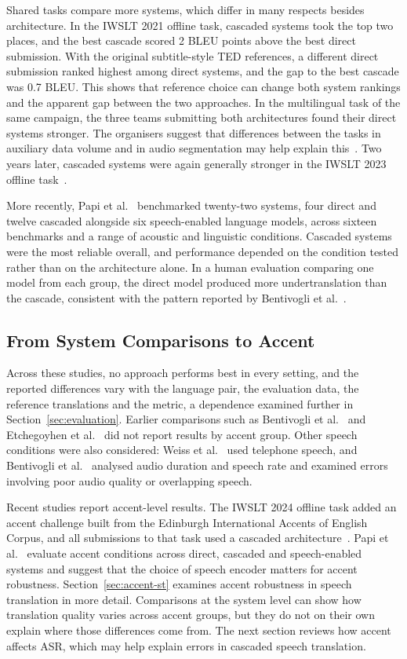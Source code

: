 Shared tasks compare more systems, which differ in many respects besides
architecture. In the IWSLT 2021 offline task, cascaded systems took the top two
places, and the best cascade scored 2 BLEU points above the best direct
submission. With the original subtitle-style TED references, a different direct
submission ranked highest among direct systems, and the gap to the best cascade
was 0.7 BLEU. This shows that reference choice can change both system rankings
and the apparent gap between the two approaches. In the multilingual task of
the same campaign, the three teams submitting both architectures found their
direct systems stronger.
The organisers suggest that differences between the tasks in auxiliary data
volume and in audio segmentation may help explain
this~\cite{anastasopoulos2021iwslt}. Two years later, cascaded systems were
again generally stronger in the IWSLT 2023 offline
task~\cite{agarwal2023iwslt}.

More recently, Papi et al.~\cite{papi2026hearing} benchmarked twenty-two
systems, four direct and twelve cascaded alongside six speech-enabled language
models, across sixteen benchmarks and a range of acoustic and linguistic
conditions. Cascaded systems were the most reliable overall, and performance
depended on the condition tested rather than on the architecture alone. In a
human evaluation comparing one model from each group, the direct model produced
more undertranslation than the cascade, consistent with the pattern reported by
Bentivogli et al.~\cite{bentivogli2021cascade}.

\subsection{From System Comparisons to Accent}

Across these studies, no approach performs best in every setting, and the
reported differences vary with the language pair, the evaluation data, the
reference translations and the metric, a dependence examined further in
Section~\ref{sec:evaluation}. Earlier comparisons such as Bentivogli et
al.~\cite{bentivogli2021cascade} and Etchegoyhen et
al.~\cite{etchegoyhen2022casestudy} did not report results by accent group.
Other speech conditions were also considered: Weiss et
al.~\cite{weiss2017sequence} used telephone speech, and Bentivogli et
al.~\cite{bentivogli2021cascade} analysed audio duration and speech rate and
examined errors involving poor audio quality or overlapping speech.

Recent studies report accent-level results. The IWSLT 2024 offline task
added an accent challenge built from the Edinburgh International Accents of
English Corpus, and all submissions to that task used a cascaded
architecture~\cite{ahmad2024iwslt}. Papi et al.~\cite{papi2026hearing}
evaluate accent conditions across direct, cascaded and speech-enabled
systems and suggest that the choice of speech encoder matters for accent
robustness. Section~\ref{sec:accent-st} examines accent robustness in speech
translation in more detail. Comparisons at the system level can show how
translation quality varies across accent groups, but they do not on their
own explain where those differences come from. The next section reviews how
accent affects ASR, which may help explain errors in cascaded speech
translation.
